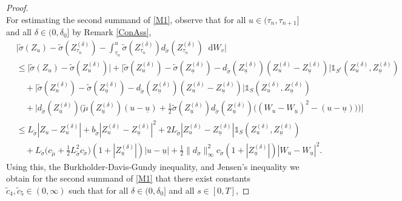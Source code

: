 \documentclass[11pt,a4paper]{article}
\numberwithin{equation}{section}
\theoremstyle{definition}
\newcommand{\diff}{\mathop{}\!\mathrm{d}}
\begin{document}
\begin{proof}
\begin{equation}
\end{equation}
For estimating the second summand of \eqref{M1}, observe that for all $u\in(\tau_n,\tau_{n+1}]$ and all $\delta\in(0,\delta_0]$ by Remark \ref{ConAss},
\begin{equation}\label{M52}
    \begin{aligned}
    &\Big|\widetilde\sigma(Z_u) -\widetilde\sigma(Z^{(\delta)}_{\tau_n}) - \int_{\tau_n}^u \widetilde\sigma(Z^{(\delta)}_{\tau_n}) d_{\widetilde\sigma} (Z^{(\delta)}_{\tau_n}) \diff W_v\Big|\\
    &\leq \big|\widetilde\sigma ( Z_{u}) - \widetilde\sigma (Z^{(\delta)}_{u})\big|
    + \big|\widetilde\sigma (Z^{(\delta)}_{u}) - \widetilde\sigma (Z^{(\delta)}_{\underline u}) -d_{\widetilde\sigma} (Z^{(\delta)}_{\underline u})(Z^{(\delta)}_{u} - Z^{(\delta)}_{\underline u})\big|\mathds{1}_{S^c}(Z^{(\delta)}_{u},Z^{(\delta)}_{\underline u}) \\
    &\quad + \big|\widetilde\sigma (Z^{(\delta)}_{u}) - \widetilde\sigma (Z^{(\delta)}_{\underline u}) -d_{\widetilde\sigma} (Z^{(\delta)}_{\underline u})(Z^{(\delta)}_{u} - Z^{(\delta)}_{\underline u})\big|\mathds{1}_{S}(Z^{(\delta)}_{u},Z^{(\delta)}_{\underline u})\\
    &\quad + \Big|d_{\widetilde\sigma} (Z^{(\delta)}_{\underline u})\Big( \widetilde\mu(Z^{(\delta)}_{\underline u})(u-\underline u) +\frac{1}{2} \widetilde\sigma (Z^{(\delta)}_{\underline u})d_{\widetilde\sigma} (Z^{(\delta)}_{\underline u})\big((W_u-W_{\underline u})^2-(u-\underline u)\big)\Big)\Big|\\
    &\leq L_{\widetilde\sigma} |Z_{u} - Z^{(\delta)}_{u}|
    + b_{\widetilde\sigma } |Z^{(\delta)}_{u} - Z^{(\delta)}_{\underline u} |^2 
    + 2L_{\widetilde\sigma} |Z^{(\delta)}_{u} - Z^{(\delta)}_{\underline u}|\mathds{1}_{S}(Z^{(\delta)}_{u},Z^{(\delta)}_{\underline u})\\
    &\quad + L_{\widetilde\sigma} \Big(c_{\widetilde\mu} + \frac{1}{2}L_{\widetilde\sigma}^2 c_{\widetilde\sigma}\Big)(1+|Z^{(\delta)}_{\underline u}|) |u-\underline u| +\frac{1}{2}\|d_{\widetilde\sigma}\|^2_\infty c_{\widetilde\sigma}(1+|Z^{(\delta)}_{\underline u}|) |W_u-W_{\underline u}|^2.
    \end{aligned}
\end{equation}
Using this, the Burkholder-Davis-Gundy inequality, and Jensen's inequality we obtain for the second summand of \eqref{M1} that there exist constants $\widetilde c_4, \widetilde c_{5} \in (0,\infty)$ such that for all $\delta\in(0,\delta_0]$ and all $s\in[0,T]$,

\end{proof}
\end{document}
